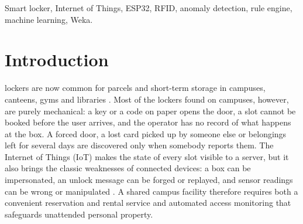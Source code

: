 \maketitle

\begin{abstract}
Shared lockers on university campuses are still opened with mechanical keys or paper codes, cannot be reserved,
and give staff no view of forced doors, lost cards or forgotten items; once networked, their unlock signal can also be
forged or replayed. This paper presents SmartLocker, a locker rental system in which users reserve a slot on a web map,
pay from a prepaid wallet and open it with a personal identification number (PIN), a radio-frequency identification
(RFID) card, a fingerprint or a phone page. The ESP32 box takes no access decision: it forwards every credential to the
server, which replies \texttt{UNLOCK} or \texttt{DENY}. Abnormal access is detected mainly by a priority-ordered rule
engine over device telemetry and server context, which recognises sensor faults, spoofed remote opens, lost cards,
forced opening, wrong-user access, items left behind and overdue storage. A machine-learning risk score is kept only as
a secondary signal and raises an alert for sessions that no rule explains. On synthetic labelled sessions, the best of
four Weka classifiers made almost all of its errors between wrong-user and normal sessions, which share the same
telemetry by construction; identity is therefore checked by rule, and the score should be trusted only once real
sessions are available. All automated tests and replayed detection scenarios passed, and the server answered every %
device request within about 0.1~s.
\end{abstract}

\begin{IEEEkeywords}
Smart locker, Internet of Things, ESP32, RFID, anomaly detection, rule engine, machine learning, Weka.
\end{IEEEkeywords}

\section{Introduction}

 lockers are now common for parcels and short-term storage in campuses, canteens, gyms
and libraries \cite{iwan2016parcel}. Most of the lockers found on campuses, however, are purely mechanical: a key or a
code on paper opens the door, a slot cannot be booked before the user arrives, and the operator has no record of what
happens at the box. A forced door, a lost card picked up by someone else or belongings left for several days are
discovered only when somebody reports them. The Internet of Things (IoT) \cite{alfuqaha2015iot} makes the state of
every slot visible to a server, but it also brings the classic weaknesses of connected devices: a box can be
impersonated, an unlock message can be forged or replayed, and sensor readings can be wrong or manipulated
\cite{sicari2015security, roman2013features}. A shared campus facility therefore requires both a convenient reservation
and rental service and automated access monitoring that safeguards unattended personal property.

